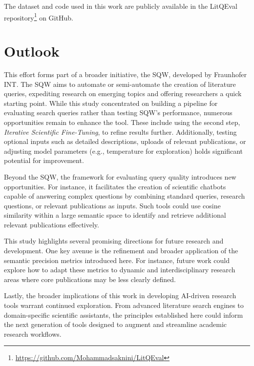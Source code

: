 The dataset and code used in this work are publicly available in the LitQEval repository\footnote{\url{https://github.com/Mohammadsaknini/LitQEval}} on GitHub.

\section{Outlook}
This effort forms part of a broader initiative, the SQW, developed by Fraunhofer INT. The SQW aims to automate or semi-automate the creation of literature queries, expediting research on emerging topics and offering researchers a quick starting point. While this study concentrated on building a pipeline for evaluating search queries rather than testing SQW's performance, numerous opportunities remain to enhance the tool. These include using the second step, \textit{Iterative Scientific Fine-Tuning}, to refine results further. Additionally, testing optional inputs such as detailed descriptions, uploads of relevant publications, or adjusting model parameters (e.g., temperature for exploration) holds significant potential for improvement.

Beyond the SQW, the framework for evaluating query quality introduces new opportunities. For instance, it facilitates the creation of scientific chatbots capable of answering complex questions by combining standard queries, research questions, or relevant publications as inputs. Such tools could use cosine similarity within a large semantic space to identify and retrieve additional relevant publications effectively.

This study highlights several promising directions for future research and development. One key avenue is the refinement and broader application of the semantic precision metrics introduced here. For instance, future work could explore how to adapt these metrics to dynamic and interdisciplinary research areas where core publications may be less clearly defined. 

Lastly, the broader implications of this work in developing AI-driven research tools warrant continued exploration. From advanced literature search engines to domain-specific scientific assistants, the principles established here could inform the next generation of tools designed to augment and streamline academic research workflows.